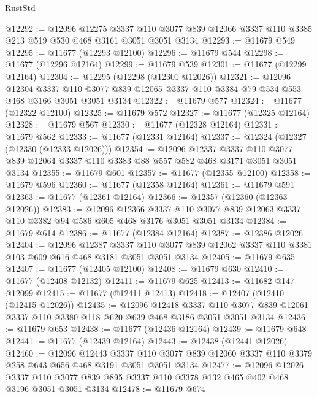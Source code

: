 \begin{lexlean}{RustStd}
\begin{coremodule}
@12292 := @12096
    @12275
    @3337
    @110
    @3077
    @839
    @12066
    @3337
    @110
    @3385
    @213
    @519
    @530
    @468
    @3161
    @3051
    @3051
    @3134
@12293 := @11679 @549
@12295 := @11677 (@12293 @12100)
@12296 := @11679 @544
@12298 := @11677 (@12296 @12164)
@12299 := @11679 @539
@12301 := @11677 (@12299 @12164)
@12304 := @12295 (@12298 (@12301 @12026))
@12321 := @12096
    @12304
    @3337
    @110
    @3077
    @839
    @12065
    @3337
    @110
    @3384
    @79
    @534
    @553
    @468
    @3166
    @3051
    @3051
    @3134
@12322 := @11679 @577
@12324 := @11677 (@12322 @12100)
@12325 := @11679 @572
@12327 := @11677 (@12325 @12164)
@12328 := @11679 @567
@12330 := @11677 (@12328 @12164)
@12331 := @11679 @562
@12333 := @11677 (@12331 @12164)
@12337 := @12324 (@12327 (@12330 (@12333 @12026)))
@12354 := @12096
    @12337
    @3337
    @110
    @3077
    @839
    @12064
    @3337
    @110
    @3383
    @88
    @557
    @582
    @468
    @3171
    @3051
    @3051
    @3134
@12355 := @11679 @601
@12357 := @11677 (@12355 @12100)
@12358 := @11679 @596
@12360 := @11677 (@12358 @12164)
@12361 := @11679 @591
@12363 := @11677 (@12361 @12164)
@12366 := @12357 (@12360 (@12363 @12026))
@12383 := @12096
    @12366
    @3337
    @110
    @3077
    @839
    @12063
    @3337
    @110
    @3382
    @94
    @586
    @605
    @468
    @3176
    @3051
    @3051
    @3134
@12384 := @11679 @614
@12386 := @11677 (@12384 @12164)
@12387 := @12386 @12026
@12404 := @12096
    @12387
    @3337
    @110
    @3077
    @839
    @12062
    @3337
    @110
    @3381
    @103
    @609
    @616
    @468
    @3181
    @3051
    @3051
    @3134
@12405 := @11679 @635
@12407 := @11677 (@12405 @12100)
@12408 := @11679 @630
@12410 := @11677 (@12408 @12132)
@12411 := @11679 @625
@12413 := @11682 @147 @12099
@12415 := @11677 (@12411 @12413)
@12418 := @12407 (@12410 (@12415 @12026))
@12435 := @12096
    @12418
    @3337
    @110
    @3077
    @839
    @12061
    @3337
    @110
    @3380
    @118
    @620
    @639
    @468
    @3186
    @3051
    @3051
    @3134
@12436 := @11679 @653
@12438 := @11677 (@12436 @12164)
@12439 := @11679 @648
@12441 := @11677 (@12439 @12164)
@12443 := @12438 (@12441 @12026)
@12460 := @12096
    @12443
    @3337
    @110
    @3077
    @839
    @12060
    @3337
    @110
    @3379
    @258
    @643
    @656
    @468
    @3191
    @3051
    @3051
    @3134
@12477 := @12096
    @12026
    @3337
    @110
    @3077
    @839
    @895
    @3337
    @110
    @3378
    @132
    @465
    @402
    @468
    @3196
    @3051
    @3051
    @3134
@12478 := @11679 @674

\end{coremodule}
\end{lexlean}
